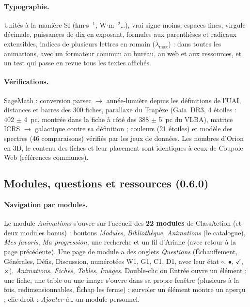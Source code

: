 \paragraph{Typographie.} Unités à la manière SI (km$\cdot$s$^{-1}$, W$\cdot$m$^{-2}$…), vrai signe moins, espaces
fines, virgule décimale, puissances de dix en exposant, formules aux parenthèses et radicaux extensibles, indices de
plusieurs lettres en romain ($\lambda_{\mathrm{max}}$) : dans toutes les animations, avec un formateur commun au
bureau, au web et aux ressources, et un test qui passe en revue tous les textes affichés.

\paragraph{Vérifications.} SageMath : conversion parsec $\to$ année-lumière depuis les définitions de l'UAI, distances
et barres des 300 fiches, parallaxe du Trapèze (Gaia~DR3, 4 étoiles : 402 $\pm$ 4~pc, montrée dans la fiche à côté des
388 $\pm$ 5~pc du VLBA), matrice ICRS $\to$ galactique contre sa définition ; couleurs (21 étoiles) et modèle des spectres
(46 comparaisons) vérifiés par les jeux de données. Les nombres d'Orion en 3D, le contenu des fiches et leur placement
sont identiques à ceux de Coupole Web (références communes).

\subsection{Modules, questions et ressources (0.6.0)}\label{sec:classe}
\paragraph{Navigation par modules.} Le module \emph{Animations} s'ouvre sur l'accueil des \textbf{22 modules} de
ClassAction (et deux modules bonus) : boutons \emph{Modules}, \emph{Bibliothèque}, \emph{Animations} (le catalogue), \emph{Mes favoris},
\emph{Ma progression}, une recherche et un fil d'Ariane (avec retour à la page précédente). Une page de module a des
onglets \emph{Questions} (Échauffement, Générales, Défis, Discussion, numérotées W1, G1, C1, D1, avec leur état
$\circ$, $\bullet$, $\checkmark$, $\times$), \emph{Animations}, \emph{Fiches}, \emph{Tables}, \emph{Images}. Double-clic ou Entrée ouvre un élément ; une
fiche, une table ou une image s'ouvre dans sa propre fenêtre (plusieurs à la fois, redimensionnables, Échap les
ferme) ; survoler un élément montre un aperçu ; clic droit : \emph{Ajouter à\dots{}} un module personnel.

